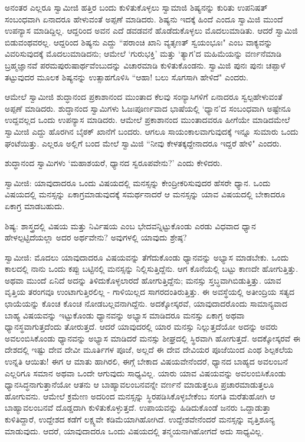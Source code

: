 ಅನಂತರ ಎಲ್ಲರೂ ಸ್ವಾಮೀಜಿ ಹತ್ತಿರ ಬಂದು ಕುಳಿತುಕೊಳ್ಳಲು ಸ್ವಾಮಾಜಿ ಶಿಷ್ಯನನ್ನು ಕುರಿತು ಉಪನಿಷತ್‌ ಸಂಬಂಧವಾಗಿ ಏನಾದರೂ ಹೇಳುವಂತೆ ಅಪ್ಪಣೆ ಮಾಡಿದರು. ಶಿಷ್ಯನು ಇದಕ್ಕೆ ಹಿಂದೆ ಎಂದೂ ಸ್ವಾಮಿಜಿ ಮುಂದೆ ಉಪನ್ಯಾಸ ಮಾಡಿದ್ದಿಲ್ಲ. ಆದ್ದರಿಂದ ಅವನ ಎದೆ ಡವಡವನೆ ಹೊಡೆದುಕೊಳ್ಳಲು ಮೊದಲುಮಾಡಿತು. ಆದರೆ ಸ್ವಾಮಿಜಿ ಬಿಡುವಂಥವರಲ್ಲ. ಆದ್ದರಿಂದ ಶಿಷ್ಯನು ಎದ್ದು “ಪರಾಂಚಿ ಖಾನಿ ವ್ಯತೃಣತ್ ಸ್ವಯಂಭೂಃ" ಎಂಬ ವಾಕ್ಯವನ್ನು ವಿವರಿಸುವುದಕ್ಕೆ ಮೊದಲುಮಾಡಿದನು; ಆಮೇಲೆ ‘ಗುರುಭಕ್ತಿ’ ಮತ್ತು ‘ತ್ಯಾಗ’ದ ಮಹಿಮೆಯನ್ನು ವರ್ಣನೆಮಾಡಿ ಬ್ರಹ್ಮಜ್ಞಾನವೆ ಪರಮಪುರುಷಾರ್ಥವೆಂಬುದನ್ನು ವಿಚಾರಮಾಡಿ ಕುಳಿತುಕೊಂಡನು. ಸ್ವಾಮಿಜಿ ಪುನಃ ಪುನಃ ಚಪ್ಪಾಳೆ ತಟ್ಟುವುದರ ಮೂಲಕ ಶಿಷ್ಯನನ್ನು ಉತ್ಸಾಹಗೊಳಿಸಿ “ಆಹಾ! ಬಲು ಸೊಗಸಾಗಿ ಹೇಳಿದೆ" ಎಂದರು.

ಆಮೇಲೆ ಸ್ವಾಮೀಜಿ ಶುದ್ಧಾನಂದ ಪ್ರಕಾಶಾನಂದ ಮುಂತಾದ ಕೆಲವು ಸಂನ್ಯಾಸಿಗಳಿಗೆ ಏನಾದರೂ ಸ್ವಲ್ಪಹೇಳುವಂತೆ ಅಪ್ಪಣೆ ಮಾಡಿದರು. ಶುದ್ಧಾನಂದ ಸ್ವಾಮಿಗಳು ಓಜಃಪೂರ್ಣವಾದ ಭಾಷೆಯಲ್ಲಿ ‘ಧ್ಯಾನ’ದ ಸಂಬಂಧವಾಗಿ ಅಷ್ಟೇನೂ ಉದ್ದವಲ್ಲದ ಒಂದು ಉಪನ್ಯಾಸ ಮಾಡಿದರು. ಆಮೇಲೆ ಪ್ರಕಾಶಾನಂದ ಮುಂತಾದವರೂ ಹೀಗೆಯೇ ಮಾಡಿದಮೇಲೆ ಸ್ವಾಮೀಜಿ ಎದ್ದು ಹೊರಗಿನ ಬೈಠಕ್ ಖಾನೆಗೆ ಬಂದರು. ಆಗಲೂ ಸಾಯಂಕಾಲವಾಗುವುದಕ್ಕೆ ಇನ್ನೂ ಸುಮಾರು ಒಂದು ಘಂಟೆಯಿತ್ತು. ಎಲ್ಲರೂ ಅಲ್ಲಿಗೆ ಬಂದ ಮೇಲೆ ಸ್ವಾಮಿಜಿ “ನೀವು ಕೇಳತಕ್ಕದ್ದೇನಾದರೂ ಇದ್ದರೆ ಹೇಳಿ" ಎಂದರು.

ಶುದ್ಧಾನಂದ ಸ್ವಾಮಿಗಳು ‘ಮಹಾಶಯರೆ, ಧ್ಯಾನದ ಸ್ವರೂಪವೇನು?’ ಎಂದು ಕೇಳಿದರು.

ಸ್ವಾಮೀಜಿ: ಯಾವುದಾದರೂ ಒಂದು ವಿಷಯದಲ್ಲಿ ಮನಸ್ಸನ್ನು ಕೇಂದ್ರೀಕರಿಸುವುದರ ಹೆಸರೇ ಧ್ಯಾನ. ಒಂದು ವಿಷಯದಲ್ಲಿ ಮನಸ್ಸನ್ನು ಏಕಾಗ್ರಮಾಡುವುದಕ್ಕೆ ಸಮರ್ಥನಾದರೆ ಆ ಮನಸ್ಸನ್ನು ಯಾವ ವಿಷಯದಲ್ಲಿ ಬೇಕಾದರೂ ಏಕಾಗ್ರ ಮಾಡಬಹುದು.

ಶಿಷ್ಯ: ಶಾಸ್ತ್ರದಲ್ಲಿ ವಿಷಯ ಮತ್ತು ನಿರ್ವಿಷಯ ಎಂಬ ಭೇದವನ್ನಿಟ್ಟುಕೊಂಡು ಎರಡು ವಿಧವಾದ ಧ್ಯಾನ ಹೇಳಲ್ಪಟ್ಟಿದೆಯಲ್ಲಾ ಅದರ ಅರ್ಥವೇನು? ಅವುಗಳಲ್ಲಿ ಯಾವುದು ಶ್ರೇಷ್ಠ?

ಸ್ವಾಮೀಜಿ: ಮೊದಲು ಯಾವುದಾದರೂ ವಿಷಯವನ್ನು ತೆಗೆದುಕೊಂಡು ಧ್ಯಾನವನ್ನು ಅಭ್ಯಾಸ ಮಾಡಬೇಕು. ಒಂದು ಕಾಲದಲ್ಲಿ ನಾನು ಒಂದು ಕಪ್ಪು ಬಟ್ಟಿನಲ್ಲಿ ಮನಸ್ಸನ್ನು ನಿಲ್ಲಿಸುತ್ತಿದ್ದೆನು. ಆಗ ಕೊನೆಯಲ್ಲಿ ಬಟ್ಟು ಕಾಣದೇ ಹೋಗುತ್ತಿತ್ತು. ಅಥವಾ ಮುಂದೆ ಏನಿದೆ ಅದನ್ನು ತಿಳಿದುಕೊಳ್ಳಲಾರದೆ ಹೋಗುತ್ತಿದ್ದೆನು; ಮನಸ್ಸು ಸ್ತಬ್ಧವಾಗಿಬಿಡುತ್ತಿತ್ತು. ಯಾವ ವೃತ್ತಿಯ ತರಂಗವೂ ಉಂಟಾಗುತ್ತಿರಲಿಲ್ಲ - ಗಾಳಿಯಿಲ್ಲದ ಸಾಗರದಂತಿರುತ್ತಿತ್ತು. ಈ ಅವಸ್ಥೆಯಲ್ಲಿ ಅತೀಂದ್ರಿಯ ಸತ್ಯದ ಛಾಯೆಯನ್ನು ಕೊಂಚ ಕೊಂಚ ನೋಡಬಲ್ಲವನಾಗಿದ್ದೆನು. ಅದಕ್ಕೋಸ್ಕರವೆ, ಯಾವುದಾದರೊಂದು ಸಾಮಾನ್ಯವಾದ ಬಾಹ್ಯ ವಿಷಯವನ್ನು ಇಟ್ಟುಕೊಂಡು ಧ್ಯಾನವನ್ನು ಅಭ್ಯಾಸ ಮಾಡಿದರೂ ಮನಸ್ಸು ಏಕಾಗ್ರ ಅಥವಾ ಧ್ಯಾನಸ್ಥವಾಗುತ್ತದೆಂದು ತೋರುತ್ತದೆ. ಆದರೆ ಯಾವುದರಲ್ಲಿ ಯಾರ ಮನಸ್ಸು ನಿಲ್ಲುತ್ತದೆಯೋ ಅದನ್ನು ಅವರು ಅವಲಂಬಿಸಿಕೊಂಡು ಧ್ಯಾನವನ್ನು ಅಭ್ಯಾಸ ಮಾಡಿದರೆ ಮನಸ್ಸು ಶೀಘ್ರದಲ್ಲಿ ಸ್ಥಿರವಾಗಿ ಹೋಗುತ್ತದೆ. ಅದಕ್ಕೋಸ್ಕರವೆ ಈ ದೇಶದಲ್ಲಿ ಇಷ್ಟು ದೇವ ದೇವೀ ಮೂರ್ತಿಗಳ ಪೂಜೆ, ಅಲ್ಲದೆ ಈ ದೇವ ದೇವಿಯರ ಪೂಜೆಯಿಂದ ಎಂಥ ಶಿಲ್ಪಕಲೆಯ ಉನ್ನತಿ ಆಯಿತು! ಈಗ ಆ ಮಾತು ಹಾಗಿರಲಿ, ಈಗ್ಗೆ ಬೇಕಾದ ವಿಷಯವೇನೆಂದರೆ, ಧ್ಯಾನದ ಬಾಹ್ಯದ ಅವಲಂಬನೆ ಎಲ್ಲರಿಗೂ ಸಮಾನ ಅಥವಾ ಒಂದೇ ಆಗುವುದು ಸಾಧ್ಯವಿಲ್ಲ. ಯಾರು ಯಾವ ವಿಷಯವನ್ನು ಅವಲಂಬಿಸಿಕೊಂಡು ಧ್ಯಾನಸಿದ್ಧನಾಗುತ್ತಾನೆಯೋ ಆತನು ಆ ಬಾಹ್ಯಾವಲಂಬನವನ್ನೇ ವರ್ಣನೆ ಮಾಡುತ್ತಲೂ ಪ್ರಚಾರಮಾಡುತ್ತಲೂ ಹೋಗುವನು. ಆಮೇಲೆ ಕ್ರಮೇಣ ಅದರಿಂದ ಮನಸ್ಸನ್ನು ಸ್ಥಿರಪಡಿಸಿಕೊಳ್ಳಬೇಕೆಂಬ ಸಂಗತಿ ಮರೆತುಹೋಗಿ ಆ ಬಾಹ್ಯಾವಲಂಬನವೆ ದೊಡ್ಡದಾಗಿ ಕುಳಿತುಕೊಳ್ಳುತ್ತದೆ. ಉಪಾಯವನ್ನು ಹಿಡಿದುಕೊಂಡೆ ಜನರು ಒದ್ದಾಡುತ್ತಾ ಕುಳಿತಿದ್ದಾರೆ, ಉದ್ದೇಶದ ಕಡೆಗೆ ಲಕ್ಷ್ಯವೇ ಕಡಿಮೆಯಾಗಿಹೋಗಿದೆ. ಉದ್ದೇಶವೇನೆಂದರೆ ಮನಸ್ಸನ್ನು ವೃತ್ತಿಶೂನ್ಯ ಮಾಡುವುದು. ಆದರೆ, ಯಾವುದಾದರೂ ಒಂದು ವಿಷಯದಲ್ಲಿ ತನ್ಮಯನಾಗಿಹೋಗದೆ ಅದು ಸಾಧ್ಯವಿಲ್ಲ.

